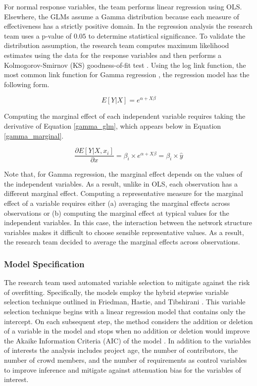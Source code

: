 For normal response variables, the team performs linear regression using OLS. Elsewhere, the GLMs assume a Gamma distribution because each measure of effectiveness has a strictly positive domain. In the regression analysis the research team uses a p-value of $0.05$ to determine statistical significance. To validate the distribution assumption, the research team computes maximum likelihood estimates using the data for the response variables and then performs a Kolmogorov-Smirnov (KS) goodness-of-fit test \cite{wackerly, massey}. Using the log link function, the most common link function for Gamma regression \cite{fahrmeir}, the regression model has the following form.

\begin{equation}
\label{gamma_glm}
    E[Y|X] = e^{\alpha + X \beta}
\end{equation}

Computing the marginal effect of each independent variable requires taking the derivative of Equation \ref{gamma_glm}, which appears below in Equation \ref{gamma_marginal}.

\begin{equation}
\label{gamma_marginal}
\frac{\partial E[Y|X, x_i]}{\partial x} = \beta_i \times e^{\alpha + X \beta}  = \beta_i \times \hat{y}
\end{equation}

Note that, for Gamma regression, the marginal effect depends on the values of the independent variables. As a result, unlike in OLS, each observation has a different marginal effect. Computing a representative measure for the marginal effect of a variable requires either (a) averaging the marginal effects across observations or (b) computing the marginal effect at typical values for the independent variables. In this case, the interaction between the network structure variables makes it difficult to choose sensible representative values. As a result, the research team decided to average the marginal effects across observations.

\subsubsection{Model Specification}

The research team used automated variable selection to mitigate against the risk of overfitting. Specifically, the models employ the hybrid stepwise variable selection technique outlined in Friedman, Hastie, and Tibshirani \cite{friedman, derkson}. This variable selection technique begins with a linear regression model that contains only the intercept. On each subsequent step, the method considers the addition or deletion of a variable in the model and stops when no addition or deletion would improve the Akaike Information Criteria (AIC) of the model \cite{friedman}. In addition to the variables of interests the analysis includes project age, the number of contributors, the number of crowd members, and the number of requirements as control variables to improve inference and mitigate against attenuation bias for the variables of interest.

